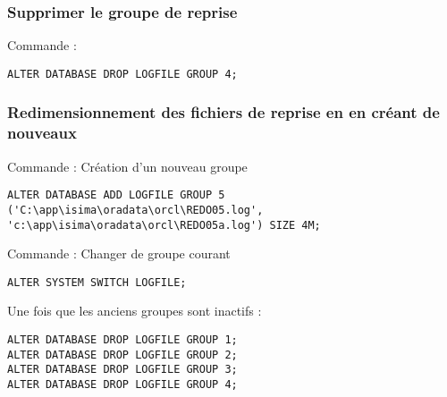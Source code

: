 \subsubsection{Supprimer le groupe de reprise}

Commande : 
\begin{verbatim}
ALTER DATABASE DROP LOGFILE GROUP 4;
\end{verbatim}


\subsubsection{Redimensionnement des fichiers de reprise en en créant de nouveaux }
Commande : Création d'un nouveau groupe
\begin{verbatim}
ALTER DATABASE ADD LOGFILE GROUP 5 ('C:\app\isima\oradata\orcl\REDO05.log', 'c:\app\isima\oradata\orcl\REDO05a.log') SIZE 4M;
\end{verbatim}

Commande : Changer de groupe courant
\begin{verbatim}
ALTER SYSTEM SWITCH LOGFILE;
\end{verbatim}

Une fois que les anciens groupes sont inactifs :
\begin{verbatim}
ALTER DATABASE DROP LOGFILE GROUP 1;
ALTER DATABASE DROP LOGFILE GROUP 2;
ALTER DATABASE DROP LOGFILE GROUP 3;
ALTER DATABASE DROP LOGFILE GROUP 4;
\end{verbatim}	